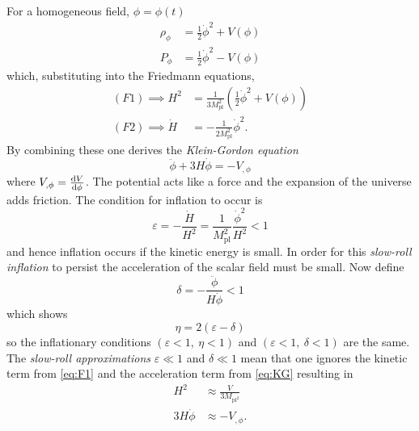 %
For a homogeneous field, \ie{} \(\phi = \phi(t)\)
%
\begin{subequations}
	\begin{align}
		\rho_{\phi} & = \frac{1}{2}\dot{\phi}^{2} + V(\phi) \\
		P_{\phi}    & = \frac{1}{2}\dot{\phi}^{2} - V(\phi)
	\end{align}
\end{subequations}
%
which, substituting into the Friedmann equations,
%
\begin{subequations}
	\begin{align}
		(F1) \implies H^{2}   & = \frac{1}{3M_{\text{pl}}^{2}} \left( \frac{1}{2}\dot{\phi}^{2} + V(\phi) \right) \\
		(F2) \implies \dot{H} & = -\frac{1}{2M_{\text{pl}}^{2}} \dot{\phi}^{2}.
	\end{align}
\end{subequations}
%
By combining these one derives the \emph{Klein-Gordon equation}
%
\begin{equation}\label{eq:KG}
	\ddot{\phi} + 3H\dot{\phi}
	= -V_{,\phi}
\end{equation}
where \(V_{,\phi} = \dv{V}{\phi}\).
The potential acts like a force and the expansion of the universe adds friction.
The condition for inflation to occur is
%
\begin{equation}
	\varepsilon
	= -\frac{\dot{H}}{H^{2}}
	= \frac{1}{M_{\text{pl}}^{2}} \frac{\dot{\phi}^{2}}{H^{2}}
	< 1
\end{equation}
%
and hence inflation occurs if the kinetic energy is small.
In order for this \emph{slow-roll inflation} to persist the acceleration of the scalar field must be small.
Now define
%
\begin{equation}
	\delta
	= -\frac{\ddot{\phi}}{H\dot{\phi}}
	< 1
\end{equation}
%
which shows
%
\begin{equation}
	\eta
	= 2(\varepsilon - \delta)
\end{equation}
%
so the inflationary conditions \((\varepsilon<1,\ \eta<1)\) and \((\varepsilon<1,\ \delta<1)\) are the same.
The \emph{slow-roll approximations} \(\varepsilon \ll 1\) and \(\delta \ll 1\) mean that one ignores the kinetic term from \cref{eq:F1} and the acceleration term from \cref{eq:KG} resulting in
%
\begin{subequations}
	\begin{align}
		H^{2}        & \approx \frac{V}{3M_{\text{pl}^{2}}} \\
		3H\dot{\phi} & \approx -V_{,\phi}.
	\end{align}
\end{subequations}
